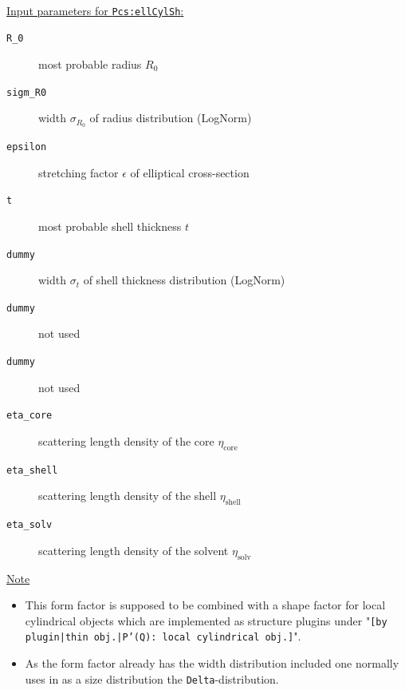 \vspace{5mm}

\hspace{1pt}\\
\uline{Input parameters for \texttt{Pcs:ellCylSh}:}
\begin{description}
    \item[\texttt{R\_0}] most probable radius $R_0$
    \item[\texttt{sigm\_R0}] width $\sigma_{R_0}$ of radius distribution (LogNorm)
    \item[\texttt{epsilon}] stretching factor $\epsilon$ of elliptical cross-section
    \item[\texttt{t}] most probable shell thickness $t$
    \item[\texttt{dummy}] width $\sigma_t$ of shell thickness distribution (LogNorm)
    \item[\texttt{dummy}] not used
    \item[\texttt{dummy}] not used
    \item[\texttt{eta\_core}] scattering length density of the core $\eta_\textrm{core}$
    \item[\texttt{eta\_shell}] scattering length density of the shell $\eta_\textrm{shell}$
    \item[\texttt{eta\_solv}] scattering length density of the solvent $\eta_\textrm{solv}$
\end{description}

\noindent
\uline{Note}
\begin{itemize}
  \item This form factor is supposed to be combined with a shape factor for
local cylindrical objects which are implemented as structure  plugins
under "\texttt{[by plugin|thin obj.|P'(Q): local cylindrical obj.]}".
\item As the form factor already has the width distribution included one normally uses in \SASfit as a size distribution
the \texttt{Delta}-distribution.
\end{itemize}


